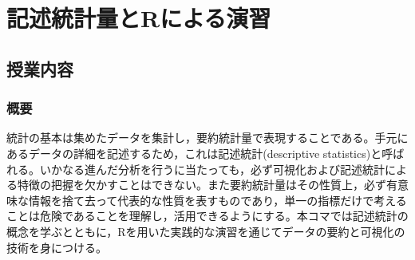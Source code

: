 \section{記述統計量とRによる演習}
\label{b05_descriptives_R}

\subsection{授業内容}
\subsubsection{概要}
統計の基本は集めたデータを集計し，要約統計量で表現することである。手元にあるデータの詳細を記述するため，これは記述統計(descriptive statistics)と呼ばれる。いかなる進んだ分析を行うに当たっても，必ず可視化および記述統計による特徴の把握を欠かすことはできない。また要約統計量はその性質上，必ず有意味な情報を捨て去って代表的な性質を表すものであり，単一の指標だけで考えることは危険であることを理解し，活用できるようにする。本コマでは記述統計の概念を学ぶとともに，Rを用いた実践的な演習を通じてデータの要約と可視化の技術を身につける。
